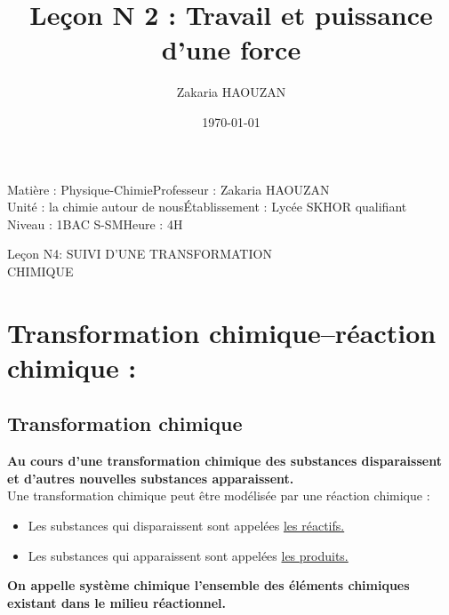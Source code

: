 \documentclass[12pt]{article}
\title{Leçon N 2 : Travail et puissance d’une force }
\author{Zakaria HAOUZAN}
\date{\today}
\newcommand\headerMe[2]{\noindent{}#1\hfill#2}
\begin{document}
\headerMe{Matière : Physique-Chimie}{Professeur : Zakaria HAOUZAN}\\
\headerMe{Unité : la chimie autour de nous}{Établissement : Lycée SKHOR qualifiant}\\
\headerMe{Niveau : 1BAC S-SM}{Heure : 4H}\\

\begin{center}

    \Large{Leçon N4: \color{red}SUIVI D’UNE TRANSFORMATION \\CHIMIQUE}
\end{center}
\begin{comment}
\section{Introduction}

\begin{wrapfigure}{r}{0.25\textwidth}
    \centering
\texttt{[image: ./img/img00.png]}
\end{wrapfigure} 
La première photo montre un dispositif expérimental permet de mesurer le volume du gaz récupérer au cours d’une transformation
chimique . Dans la deuxième photo nous observons une réaction du fer fondu avec le dioxygène qui produit des gerbes de lumière.
\\
\textbf{-Comment Le chimiste réalise-t-il des transformations chimiques
pour obtenir de nouveau corps?}\\\textbf{-Comment Le chimiste peut-il suivre des transformations
chimiques ?}
\end{comment}
\section{ Transformation chimique–réaction chimique :}
    \subsection{Transformation chimique}
        \textbf{Au cours d’une transformation chimique des substances disparaissent et d’autres nouvelles substances apparaissent.}\\
Une transformation chimique peut être modélisée par une réaction chimique :
\begin{itemize}
    \item Les substances qui disparaissent sont appelées \underline {les réactifs.}
    \item Les substances qui apparaissent sont appelées \underline{les produits.}
\end{itemize}
\textbf{On appelle système chimique l’ensemble des éléments chimiques existant dans le milieu réactionnel.}
\end{document}
